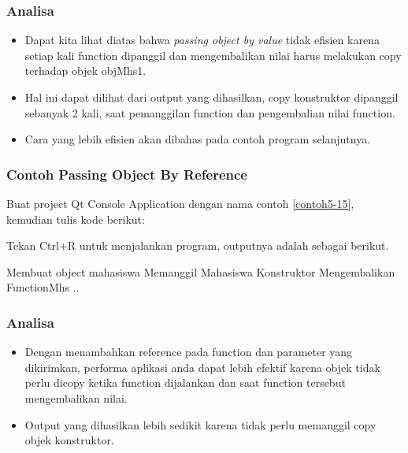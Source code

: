 \subsubsection*{Analisa}

\begin{itemize}

\item
 Dapat kita lihat diatas bahwa \emph{passing object by value} tidak
 efisien karena setiap kali function dipanggil dan mengembalikan nilai
 harus melakukan copy terhadap objek objMhs1.
\item
 Hal ini dapat dilihat dari output yang dihasilkan, copy konstruktor
 dipanggil sebanyak 2 kali, saat pemanggilan function dan pengembalian
 nilai function.
\item
 Cara yang lebih efisien akan dibahas pada contoh program selanjutnya.
\end{itemize}

\subsubsection*{Contoh Passing Object By Reference}

Buat project Qt Console Application dengan nama contoh \ref{contoh5-15}, kemudian
tulis kode berikut:



Tekan Ctrl+R untuk menjalankan program, outputnya adalah sebagai
berikut.

\begin{lcverbatim}
Membuat object mahasiswa
Memanggil Mahasiswa Konstruktor
Mengembalikan FunctionMhs ..
\end{lcverbatim}

\subsubsection*{Analisa}

\begin{itemize}

\item
 Dengan menambahkan reference pada function dan parameter yang
 dikirimkan, performa aplikasi anda dapat lebih efektif karena objek
 tidak perlu dicopy ketika function dijalankan dan saat function
 tersebut mengembalikan nilai.
\item
 Output yang dihasilkan lebih sedikit karena tidak perlu memanggil copy
 objek konstruktor.
\end{itemize}
